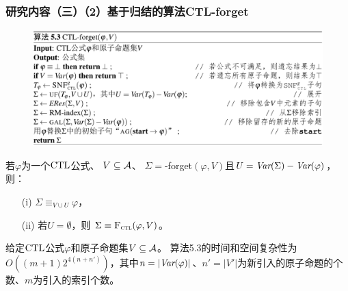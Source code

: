 \documentclass[9pt, CJK]{beamer}
\begin{document}
\begin{frame}
	\frametitle{研究内容（三）（2）基于归结的算法CTL-forget}
	{\footnotesize
	
	 
			
		\begin{figure}
			\includegraphics[scale=0.28]{figures/CTL-forget1}
		\end{figure}
			\begin{theorem}[可靠性]\label{thm:soundness:forget:algorithm}
				若$\varphi$为一个$\textrm{CTL}$公式、 $V\subseteq\cal A$、 $\Sigma=$\CTL-forget$(\varphi,V)$且$U=\textit{Var}(\Sigma)-\textit{Var}(\varphi)$，则：
				\begin{itemize}
					\item[(i)] $\Sigma\equiv_{V\cup U}\varphi$，
					\item[(ii)] 若$U=\emptyset$，则 $\Sigma\equiv{\textsc{F}_{\textsc{ctl}}}(\varphi,V)$。
				\end{itemize}
			\end{theorem}
			
		\begin{proposition}\label{pro:complexity}
			给定$\textrm{CTL}$公式$\varphi$和原子命题集$V \subseteq {\cal A}$。
			算法5.3的时间和空间复杂性为{\em $O((m+1)2^{4(n+n')})$}，其中$n=|\textit{Var}(\varphi)|$、$n'=|V'|$为新引入的原子命题的个数、$m$为引入的索引个数。
		\end{proposition} 
	}
\end{frame}
\end{document}
